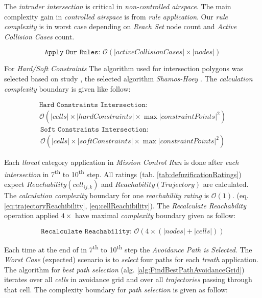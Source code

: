 \begin{note}
    The \emph{intruder intersection} is critical in \emph{non-controlled airspace}. The main complexity gain in \emph{controlled airspace} is from \emph{rule application}. Our \emph{rule complexity} is in worst case depending on \emph{Reach Set} node count and \emph{Active Collision Cases} count.
    
    \begin{equation*}
        \texttt{Apply Our Rules: } \mathscr{O}(|active Collision Cases| \times |nodes|)
    \end{equation*}
\end{note}

\newpage\noindent For \emph{Hard/Soft Constraints} The algorithm used for intersection polygons was selected based on study \citep{bentley1979algorithms}, the selected algorithm  \emph{Shamos-Hoey} \cite{shamos1976geometric}. The \emph{calculation complexity} boundary is given like follow:

\begin{multline*}
    \texttt{Hard Constraints Intersection:}\\ \mathscr{O}(|cells|\times|hard Constraints| \times \max |constraint Points|^2)
\end{multline*}
\begin{multline*}
    \texttt{Soft Constraints Intersection:}\\ \mathscr{O}(|cells|\times|soft Constraints| \times \max |constraint Points|^2)
\end{multline*}

\noindent Each \emph{threat} category application in \emph{Mission Control Run} is done after \emph{each intersection} in 7\textsuperscript{th} to 10\textsuperscript{th} step. All ratings (tab. \ref{tab:defuzificationRatings}) expect $Reachability(cell_{ij,k})$ and $Reachability(Trajectory)$  are calculated. The \emph{calculation complexity} boundary for one \emph{reachability rating} is $\mathscr{O}(1)$. (eq. \ref{eq:trajectoryReachibility}, \ref{eq:cellReachibility}). The \emph{Recalculate Reachability} operation applied $4\times$ have maximal \emph{complexity} boundary given as follow:

\begin{equation*}
    \texttt{Recalculate Reachability: } \mathscr{O}(4 \times (|nodes| + |cells|))
\end{equation*}

\noindent Each time at the end of in 7\textsuperscript{th} to 10\textsuperscript{th} step the \emph{Avoidance Path is Selected}. The \emph{Worst Case} (expected) scenario is to \emph{select} four paths for each \emph{treath} application. The algorithm for \emph{best path selection} (alg. \ref{alg:FindBestPathAvoidanceGrid}) iterates over all \emph{cells} in avoidance grid and over all \emph{trajectories} passing through that cell. The complexity boundary for \emph{path selection} is given as follow:

